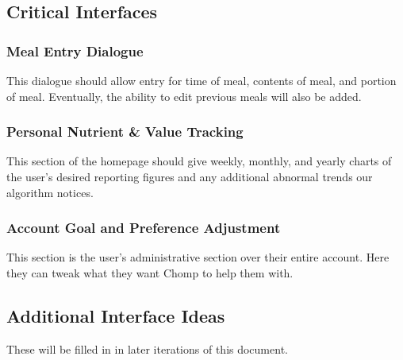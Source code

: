 \documentclass[a4paper,12pt]{article}
\begin{document}
\subsection{Critical Interfaces}
\subsubsection{Meal Entry Dialogue}
This dialogue should allow entry for time of meal, contents of meal, and portion of meal.  Eventually, the ability to edit previous meals will also be added.
\subsubsection{Personal Nutrient \& Value Tracking}
This section of the homepage should give weekly, monthly, and yearly charts of the user's desired reporting figures and any additional abnormal trends our algorithm notices.
\subsubsection{Account Goal and Preference Adjustment}
This section is the user's administrative section over their entire account.  Here they can tweak what they want Chomp to help them with.
\subsection{Additional Interface Ideas}
These will be filled in in later iterations of this document.
\end{document}
